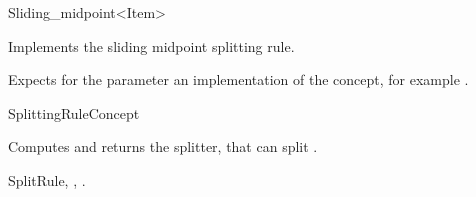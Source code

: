 

\begin{ccRefFunctionObjectClass}{Sliding_midpoint<Item>}  %


\ccDefinition
Implements the sliding midpoint splitting rule.


\ccParameters

Expects for the parameter  an implementation of the
 concept, for example .

\ccIsModel

SplittingRuleConcept

\ccTypes


\ccCreation
{}  %



{Computes and returns the splitter, that can split .}

\ccSeeAlso

SplitRule,
,
.

\end{ccRefFunctionObjectClass}


